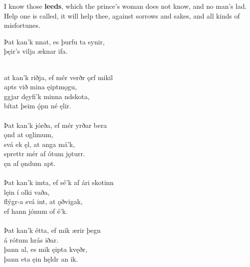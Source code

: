 \bvb I know those \textbf{leeds}, which the prince's woman does not know, and no man's lad. Help one is called, it will help thee, against sorrows and sakes\footnotemark[9], and all kinds of misfortunes. \\

\bva Þat kan'k nnat, \hld es þurfu ta synir,\footnotemark[10] \\%
\ind þęir's vilja æknar ifa.\\%

 \\

\bva {}at kan'k riðja, \hld ef mér verðr ǫrf mikil \\%
\ind {}apts við mina ęiptmǫgu, \\%
ggjar dęyfi'k \hld minna ndskota, \\%
\ind bítat þeim ǫ́pn né ęlir.\\%

 \\

\bva Þat kan'k jórða, \hld ef mér yrðar bera \\%
\ind {}ǫnd at oglimum, \\%
svá ek ęl, \hld at anga má'k, \\%
\ind sprettr mér af ótum jǫturr. \\%
\ind ęn af ǫndum apt.\\%

 \\

\bva Þat kan'k imta, \hld ef sé'k af ári skotinn \\%
\ind {}lęin í olki vaða, \\%
flýgr-a svá int, \hld at ǫðvigak, \\%
\ind ef hann jónum of é'k.\\%

 \\

\bva Þat kan'k étta, \hld ef mik ærir þegn \\%
\ind á rótum hrás iðar. \\%
þann al, \hld es mik ęipta kvęðr, \\%
\ind þann eta ęin hęldr an ik.\\%

